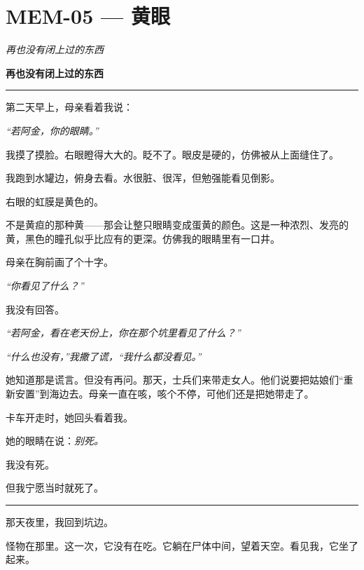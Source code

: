 \section*{\textbf{MEM-05} --- 黄眼}

\noindent \textit{再也没有闭上过的东西}

\noindent \textbf{再也没有闭上过的东西}

\vspace{0.5em}\noindent\rule{\textwidth}{0.5pt}\vspace{0.5em}

\noindent 第二天早上，母亲看着我说：

\noindent \textit{“若阿金，你的眼睛。”}

\noindent 我摸了摸脸。右眼瞪得大大的。眨不了。眼皮是硬的，仿佛被从上面缝住了。

\noindent 我跑到水罐边，俯身去看。水很脏、很浑，但勉强能看见倒影。

\noindent 右眼的虹膜是黄色的。

\noindent 不是黄疸的那种黄——那会让整只眼睛变成蛋黄的颜色。这是一种浓烈、发亮的黄，黑色的瞳孔似乎比应有的更深。仿佛我的眼睛里有一口井。

\noindent 母亲在胸前画了个十字。

\noindent \textit{“你看见了什么？”}

\noindent 我没有回答。

\noindent \textit{“若阿金，看在老天份上，你在那个坑里看见了什么？”}

\noindent \textit{“什么也没有，”我撒了谎，“我什么都没看见。”}

\noindent 她知道那是谎言。但没有再问。那天，士兵们来带走女人。他们说要把姑娘们“重新安置”到海边去。母亲一直在咳，咳个不停，可他们还是把她带走了。

\noindent 卡车开走时，她回头看着我。

\noindent 她的眼睛在说：\textit{别死。}

\noindent 我没有死。

\noindent 但我宁愿当时就死了。

\vspace{0.5em}\noindent\rule{\textwidth}{0.5pt}\vspace{0.5em}

\noindent 那天夜里，我回到坑边。

\noindent 怪物在那里。这一次，它没有在吃。它躺在尸体中间，望着天空。看见我，它坐了起来。

